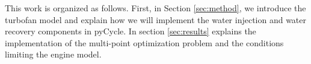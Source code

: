 \documentclass[conf]{new-aiaa}
\begin{document}
This work is organized as follows. First, in Section \ref{sec:method}, we introduce the turbofan model and explain how we will implement the water injection and water recovery components in pyCycle.
In section \ref{sec:results} explains the implementation of the multi-point optimization problem and the conditions limiting the engine model.

\end{document}
